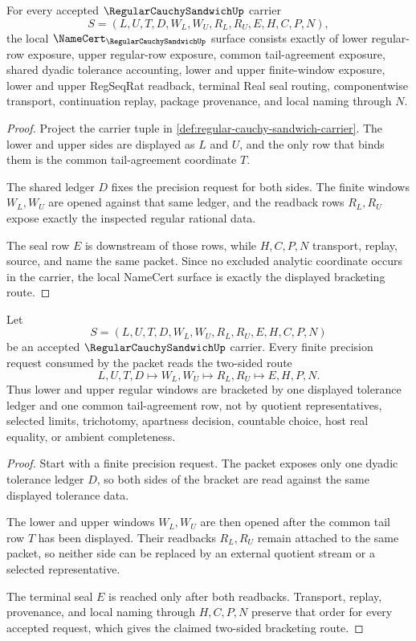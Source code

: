 \begin{theorem}
\label{thm:regular-cauchy-sandwich-namecert-obligations}
For every accepted $\RegularCauchySandwichUp$ carrier
$$
S=(L,U,T,D,W_L,W_U,R_L,R_U,E,H,C,P,N),
$$
the local $\NameCert_{\RegularCauchySandwichUp}$ surface consists exactly of lower regular-row exposure, upper regular-row exposure, common tail-agreement exposure, shared dyadic tolerance accounting, lower and upper finite-window exposure, lower and upper RegSeqRat readback, terminal Real seal routing, componentwise transport, continuation replay, package provenance, and local naming through $N$.
\end{theorem}
\begin{proof}
Project the carrier tuple in \autoref{def:regular-cauchy-sandwich-carrier}. The lower and upper sides are displayed as $L$ and $U$, and the only row that binds them is the common tail-agreement coordinate $T$.

The shared ledger $D$ fixes the precision request for both sides. The finite windows $W_L,W_U$ are opened against that same ledger, and the readback rows $R_L,R_U$ expose exactly the inspected regular rational data.

The seal row $E$ is downstream of those rows, while $H,C,P,N$ transport, replay, source, and name the same packet. Since no excluded analytic coordinate occurs in the carrier, the local NameCert surface is exactly the displayed bracketing route.
\end{proof}

\begin{theorem}
\label{thm:regular-cauchy-sandwich-window-bracketing}
Let
$$
S=(L,U,T,D,W_L,W_U,R_L,R_U,E,H,C,P,N)
$$
be an accepted $\RegularCauchySandwichUp$ carrier. Every finite precision request consumed by the packet reads the two-sided route
$$
L,U,T,D \longmapsto W_L,W_U \longmapsto R_L,R_U \longmapsto E,H,P,N .
$$
Thus lower and upper regular windows are bracketed by one displayed tolerance ledger and one common tail-agreement row, not by quotient representatives, selected limits, trichotomy, apartness decision, countable choice, host real equality, or ambient completeness.
\end{theorem}
\begin{proof}
Start with a finite precision request. The packet exposes only one dyadic tolerance ledger $D$, so both sides of the bracket are read against the same displayed tolerance data.

The lower and upper windows $W_L,W_U$ are then opened after the common tail row $T$ has been displayed. Their readbacks $R_L,R_U$ remain attached to the same packet, so neither side can be replaced by an external quotient stream or a selected representative.

The terminal seal $E$ is reached only after both readbacks. Transport, replay, provenance, and local naming through $H,C,P,N$ preserve that order for every accepted request, which gives the claimed two-sided bracketing route.
\end{proof}

